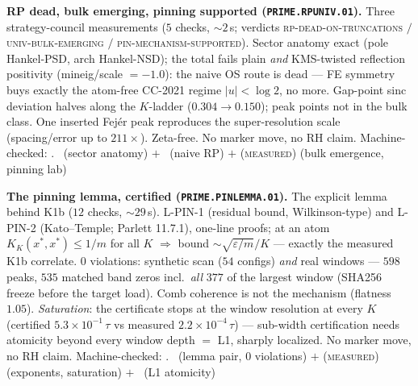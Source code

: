 \par\smallskip\noindent\textbf{RP dead, bulk emerging, pinning
supported (\texttt{PRIME.RPUNIV.01}).}
Three strategy-council measurements ($5$ checks, ${\sim}2$\,s;
verdicts \textsc{rp-dead-on-truncations} $/$
\textsc{univ-bulk-emerging} $/$ \textsc{pin-mechanism-supported}).
Sector anatomy exact (pole Hankel-PSD, arch Hankel-NSD); the total
fails plain \emph{and} KMS-twisted reflection positivity
(mineig/scale $=-1.0$): the naive OS route is dead --- FE symmetry
buys exactly the atom-free CC-2021 regime $|u|<\log2$, no more.
Gap-point sinc deviation halves along the $K$-ladder
($0.304\to0.150$); peak points not in the bulk class.  One inserted
Fej\'er peak reproduces the super-resolution scale (spacing/error up
to $211\times$).  Zeta-free.  No marker move, no RH claim.
Machine-checked: .
\mE\ (sector anatomy) $+$ \mX\ (naive RP) $+$ (\textsc{measured})
(bulk emergence, pinning lab)
\par\smallskip


\par\smallskip\noindent\textbf{The pinning lemma, certified
(\texttt{PRIME.PINLEMMA.01}).}
The explicit lemma behind K1b ($12$ checks, ${\sim}29$\,s).
L-PIN-1 (residual bound, Wilkinson-type) and L-PIN-2 (Kato--Temple;
Parlett 11.7.1), one-line proofs; at an atom $K_K(x^*,x^*)\le1/m$
for all $K$ $\Rightarrow$ bound $\sim\sqrt{\varepsilon/m}/K$ ---
exactly the measured K1b correlate.  $0$ violations: synthetic scan
($54$ configs) \emph{and} real windows --- $598$ peaks, $535$
matched band zeros incl.\ \emph{all} $377$ of the largest window
(SHA256 freeze before the target load).  Comb coherence is not the
mechanism (flatness $1.05$).  \emph{Saturation}: the certificate
stops at the window resolution at every $K$ (certified
$5.3\times10^{-1}\,\tau$ vs measured $2.2\times10^{-4}\,\tau$) ---
sub-width certification needs atomicity beyond every window depth
$=$ L1, sharply localized.  No marker move, no RH claim.
Machine-checked: .
\mE\ (lemma pair, $0$ violations) $+$ (\textsc{measured})
(exponents, saturation) $+$ \mO\ (L1 atomicity)
\par\smallskip


